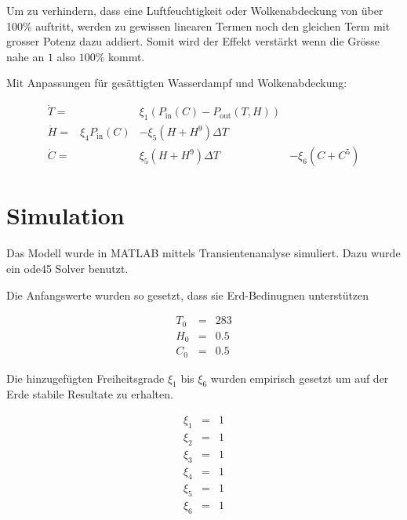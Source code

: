 \begin{refsection}
Um zu verhindern, dass eine Luftfeuchtigkeit oder Wolkenabdeckung von über 100\% auftritt, werden zu gewissen linearen Termen noch den gleichen Term mit grosser Potenz dazu addiert. Somit wird der Effekt verstärkt wenn die Grösse nahe an $1$ also $100\%$ kommt.  

Mit Anpassungen für gesättigten Wasserdampf und Wolkenabdeckung:

\begin{equation}
\begin{matrix}
\dot{T} = & & \xi_1 \left(P_{\text{in}}(C) - P_{\text{out}}(T, H) \right) &\\
\dot{H} = & \xi_4 P_{\text{in}}(C) & - \xi_5 (H + H^9) \Delta T & \\
\dot{C} = &                       &   \xi_5 (H + H^9) \Delta T & - \xi_6 (C + C^5)
\end{matrix}
\end{equation}


\section{Simulation}

Das Modell wurde in MATLAB mittels Transientenanalyse simuliert. Dazu wurde ein ode45 Solver benutzt.



Die Anfangswerte wurden so gesetzt, dass sie Erd-Bedinugnen unterstützen


\begin{equation}
\begin{matrix}
T_0 & = & 283 \\
H_0 & = & 0.5 \\
C_0 & = & 0.5
\end{matrix}
\end{equation}


Die hinzugefügten Freiheitsgrade $\xi_1$ bis $\xi_6$ wurden empirisch gesetzt um auf der Erde stabile Resultate zu erhalten.


\begin{equation}
\begin{matrix}
\xi_1 & = & 1 \\
\xi_2 & = & 1 \\
\xi_3 & = & 1 \\
\xi_4 & = & 1 \\
\xi_5 & = & 1 \\
\xi_6 & = & 1 \\
\end{matrix}
\end{equation}


\end{refsection}
